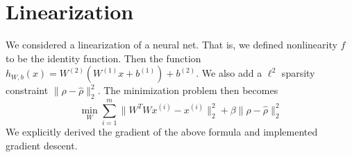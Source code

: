 \documentclass[twocolumn]{article}
\begin{document}
\section{Linearization}
We considered a linearization of a neural net. That is, we defined nonlinearity
$f$ to be the identity function. Then the function $h_{W,b}(x) =
W^{(2)}(W^{(1)}x + b^{(1)}) + b^{(2)}$.
We also add a $\ell^2$ sparsity constraint $\|\rho - \hat{\rho}\|_2^2$. The minimization problem then becomes
\[\min_W \sum_{i=1}^m \|W^TWx^{(i)} - x^{(i)}\|_2^2  + \beta \|\rho - \hat{\rho}\|_2^2 \]
We explicitly derived the gradient of the above formula and implemented gradient descent.



\end{document}
